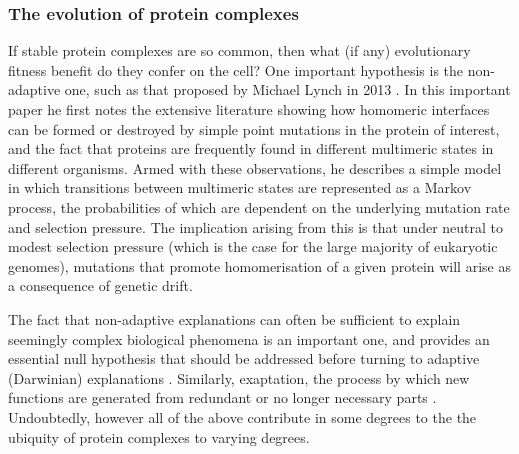 \documentclass[a4paper,11pt,twoside,openright]{scrbook}
\begin{document}
\subsubsection{The evolution of protein complexes}
If stable protein complexes are so common, then what (if any) evolutionary fitness benefit do they confer on the cell? One important hypothesis is the non-adaptive one, such as that proposed by Michael Lynch in 2013 \cite{Lynch2013}. In this important paper he first notes the extensive literature showing how homomeric interfaces can be formed or destroyed by simple point mutations in the protein of interest, and the fact that proteins are frequently found in different multimeric states in different organisms. Armed with these observations, he describes a simple model in which transitions between multimeric states are represented as a Markov process, the probabilities of which are dependent on the underlying mutation rate and selection pressure. The implication arising from this is that under neutral to modest selection pressure (which is the case for the large majority of eukaryotic genomes), mutations that promote homomerisation of a given protein will arise as a consequence of genetic drift.

The fact that non-adaptive explanations can often be sufficient to explain seemingly complex biological phenomena is an important one, and provides an essential null hypothesis that should be addressed before turning to adaptive (Darwinian) explanations \cite{Koonin2016}. Similarly, exaptation, the process by which new functions are generated from redundant or no longer necessary parts \cite{Gould1979}. Undoubtedly, however all of the above contribute in some degrees to the the ubiquity of protein complexes to varying degrees.
\end{document}
